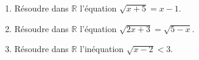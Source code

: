 \documentclass[11pt]{article}
\begin{document}
\begin{exercice}
\begin{enumerate}
  \item Résoudre dans $\mathbb{R}$ l'équation $\sqrt{x+5}=x-1$.
  \item Résoudre dans $\mathbb{R}$ l'équation $\sqrt{2x+3}=\sqrt{5-x}$.
  \item Résoudre dans $\mathbb{R}$ l'inéquation $\sqrt{x-2}<3$.
\end{enumerate}
\end{exercice}
\end{document}
